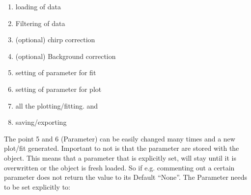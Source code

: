 \documentclass[letterpaper,10pt,english]{sphinxmanual}
\begin{document}
\begin{enumerate}
%
\item {} 
loading of data {\hyperref[\detokenize{Opening:opening-of-data}]{}}

\item {} 
Filtering of data {\hyperref[\detokenize{Shaping:bad-data-filter}]{}}

\item {} 
(optional) chirp correction {\hyperref[\detokenize{Shaping:arrival-time-correction}]{}}

\item {} 
(optional) Background correction {\hyperref[\detokenize{Shaping:background-subtraction}]{}}

\item {} 
setting of parameter for fit {\hyperref[\detokenize{Shaping:data-shaping-settings-that-affect-the-fits}]{}}

\item {} 
setting of parameter for plot {\hyperref[\detokenize{Plotting:plot-shaping-options-without-influence-on-the-fitting}]{}}

\item {} 
all the plotting/fitting. {\hyperref[\detokenize{Plotting:plotting-functions}]{}} and {\hyperref[\detokenize{Fitting:fitting-parameter-optimization-and-error-estimation}]{}}

\item {} 
saving/exporting {\hyperref[\detokenize{Saving:data-export-and-project-saving}]{}}

\end{enumerate}

The point 5 and 6 (Parameter) can be easily changed many times and a new plot/fit
generated. Important to not is that the parameter are stored with the object.
This means that a parameter that is explicitly set, will stay until it is
overwritten or the object is fresh loaded. So if e.g. commenting out a certain
parameter does not return the value to its Default “None”. The Parameter needs
to be set explicitly to:
\end{document}
